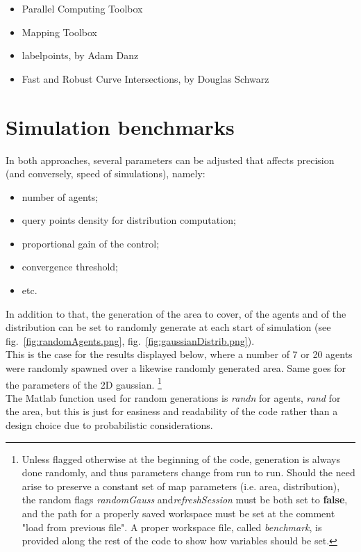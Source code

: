 \documentclass[a4paper,11pt,oneside]{book}
\begin{document}
	\begin{itemize}
		\item Parallel Computing Toolbox
		\item Mapping Toolbox
		\item labelpoints, by Adam Danz
		\item Fast and Robust Curve Intersections, by Douglas Schwarz
	\end{itemize}
	
	\section{Simulation benchmarks}
	
	In both approaches, several parameters can be adjusted that affects precision (and conversely, speed of simulations), namely:
	
	\begin{itemize}
		\item number of agents;
		\item query points density for distribution computation;
		\item proportional gain of the control;
		\item convergence threshold;
		\item etc.
	\end{itemize}
	
	In addition to that, the generation of the area to cover, of the agents and of the distribution can be set to randomly generate at each start of simulation (see fig.~\ref{fig:randomAgents.png}, fig.~\ref{fig:gaussianDistrib.png}).\\
	This is the case for the results displayed below, where a number of 7 or 20 agents were randomly spawned over a likewise randomly generated area. Same goes for the parameters of the 2D gaussian.
	 \footnote{Unless flagged otherwise at the beginning of the code, generation is always done randomly, and thus parameters change from run to run. Should the need arise to preserve a constant set of map parameters (i.e. area, distribution), the random flags \textit{randomGauss} and\textit{refreshSession} must be both set to \textbf{false}, and the path for a properly saved workspace must be set at the comment "load from previous file". A proper workspace file, called \emph{benchmark}, is provided along the rest of the code to show how variables should be set.}
	\\
	The Matlab function used for random generations is \emph{randn} for agents, \emph{rand} for the area, but this is just for easiness and readability of the code rather than a design choice due to probabilistic considerations.
	
\end{document}
